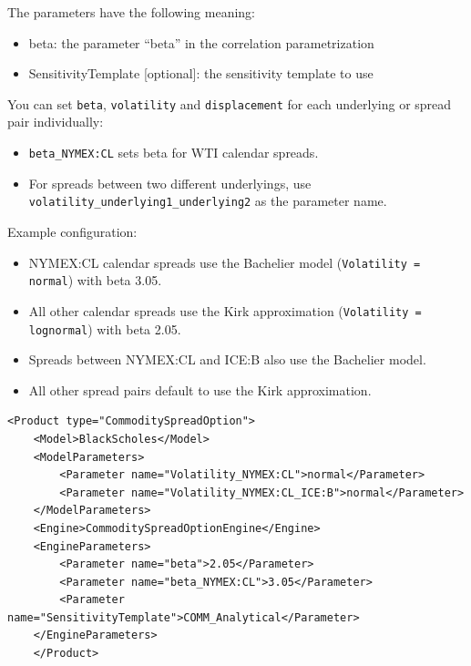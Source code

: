 The parameters have the following meaning:

\begin{itemize}
\item beta: the parameter ``beta'' in the correlation parametrization
\item SensitivityTemplate [optional]: the sensitivity template to use
\end{itemize}

You can set \texttt{beta}, \texttt{volatility} and \texttt{displacement} for each underlying or spread pair individually:
\begin{itemize}
    \item \texttt{beta\_NYMEX:CL} sets beta for WTI calendar spreads.
    \item For spreads between two different underlyings, use \texttt{volatility\_underlying1\_underlying2} as the parameter name.
\end{itemize}

Example configuration:
\begin{itemize}
    \item NYMEX:CL calendar spreads use the Bachelier model (\texttt{Volatility = normal}) with beta 3.05.
    \item All other calendar spreads use the Kirk approximation (\texttt{Volatility = lognormal}) with beta 2.05.
    \item Spreads between NYMEX:CL and ICE:B also use the Bachelier model.
    \item All other spread pairs default to use the Kirk approximation.
\end{itemize}


\begin{longlisting}
\begin{verbatim}
<Product type="CommoditySpreadOption">
    <Model>BlackScholes</Model>
    <ModelParameters>
        <Parameter name="Volatility_NYMEX:CL">normal</Parameter>
        <Parameter name="Volatility_NYMEX:CL_ICE:B">normal</Parameter>
    </ModelParameters>
    <Engine>CommoditySpreadOptionEngine</Engine>
    <EngineParameters>
        <Parameter name="beta">2.05</Parameter>
        <Parameter name="beta_NYMEX:CL">3.05</Parameter>
        <Parameter name="SensitivityTemplate">COMM_Analytical</Parameter>
    </EngineParameters>
    </Product>
\end{verbatim}
\caption{Configuration for Product CommoditySpreadOption, Model BlackScholes, Engine CommoditySpreadOptionEngine}
\label{lst:peconfig_CommoditySpreadOption_BlackScholes_CommoditySpreadOptionEngine}
\end{longlisting}

